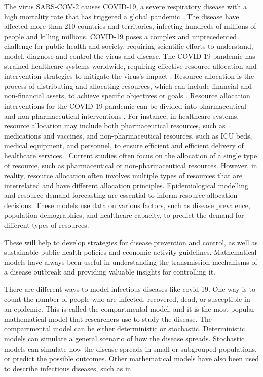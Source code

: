 \documentclass[12pt]{article}
\begin{document}
The virus SARS-COV-2 causes COVID-19, a severe respiratory disease with a high mortality rate that has triggered a global pandemic \cite{forman202012}. The disease have affected more than 210 countries and territories, infecting hundreds of millions of people and killing millions. COVID-19 poses a complex and unprecedented challenge for public health and society, requiring scientific efforts to understand, model, diagnose and control the virus and disease. The COVID-19 pandemic has strained healthcare systems worldwide, requiring effective resource allocation and intervention strategies to mitigate the virus's impact \cite{emanuel2020fair}. Resource allocation is the process of distributing and allocating resources, which can include financial and non-financial assets, to achieve specific objectives or goals \cite{jiang2019emergency}. Resource allocation interventions for the COVID-19 pandemic can be divided into pharmaceutical and non-pharmaceutical interventions \cite{ehmann2021operational}. For instance, in healthcare systems, resource allocation may include both pharmaceutical resources, such as medications and vaccines, and non-pharmaceutical resources, such as ICU beds, medical equipment, and personnel, to ensure efficient and efficient delivery of healthcare services \cite{zaric2001resource, brandeau2004allocating}. Current studies often focus on the allocation of a single type of resource, such as pharmaceutical or non-pharmaceutical resources. However, in reality, resource allocation often involves multiple types of resources that are interrelated and have different allocation principles. Epidemiological modelling and resource demand forecasting are essential to inform resource allocation decisions. These models use data on various factors, such as disease prevalence, population demographics, and healthcare capacity, to predict the demand for different types of resources.

These will help to develop strategies for disease prevention and control, as well as sustainable public health policies and economic activity guidelines. Mathematical models have always been useful in understanding the transmission mechanisms of a disease outbreak and providing valuable insights for controlling it. 

There are different ways to model infectious diseases like covid-19. One way is to count the number of people who are infected, recovered, dead, or susceptible in an epidemic. This is called the compartmental model, and it is the most popular mathematical model that researchers use to study the disease. The compartmental model can be either deterministic or stochastic. Deterministic models can simulate a general scenario of how the disease spreads. Stochastic models can simulate how the disease spreads in small or subgrouped populations, or predict the possible outcomes. Other mathematical models have also been used to describe infectious diseases, such as in
\end{document}

